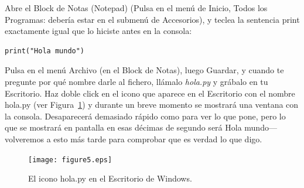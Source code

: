 \begin{WINDOWS}
Abre el Block de Notas (Notepad) (Pulsa en el menú de Inicio, Todos los Programas: debería estar en el submenú de Accesorios), y teclea la sentencia print exactamente igual que lo hiciste antes en la consola:

\begin{listing}
\begin{verbatim}
print("Hola mundo")
\end{verbatim}
\end{listing}

Pulsa en el menú Archivo (en el Block de Notas), luego Guardar, y cuando te pregunte por qué nombre darle al fichero, llámalo \emph{hola.py} y grábalo en tu Escritorio. Haz doble click en el icono que aparece en el Escritorio con el nombre hola.py (ver Figura~\ref{fig5}) y durante un breve momento se mostrará una ventana con la consola. Desaparecerá demasiado rápido como para ver lo que pone, pero lo que se mostrará en pantalla en esas décimas de segundo será Hola mundo---volveremos a esto más tarde para comprobar que es verdad lo que digo.\\

\begin{figure}
\begin{center}
\texttt{[image: figure5.eps]}
\end{center}
\caption{El icono hola.py en el Escritorio de Windows.}\label{fig5}
\end{figure}
\end{WINDOWS}

